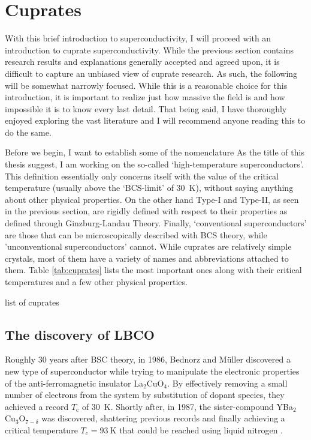\section{Cuprates}
With this brief introduction to superconductivity, I will proceed with an introduction to cuprate superconductivity. While the previous section contains research results and explanations generally accepted and agreed upon, it is difficult to capture an unbiased view of cuprate research. As such, the following will be somewhat narrowly focused. While this is a reasonable choice for this introduction, it is important to realize just how massive the field is and how impossible it is to know every last detail. That being said, I have thoroughly enjoyed exploring the vast literature and I will recommend anyone reading this to do the same.

Before we begin, I want to establish some of the nomenclature  As the title of this thesis suggest, I am working on the so-called `high-temperature superconductors'. This definition essentially only concerns itself with the value of the critical temperature (usually above the `BCS-limit' of \SI{30}{\kelvin}), without saying anything about other physical properties. On the other hand Type-I and Type-II, as seen in the previous section, are rigidly defined with respect to their properties as defined through Ginzburg-Landau Theory. Finally, `conventional superconductors' are those that can be microscopically described with BCS theory, while 'unconventional superconductors' cannot. While cuprates are relatively simple crystals, most of them have a variety of names and abbreviations attached to them. Table \ref{tab:cuprates} lists the most important ones along with their critical temperatures and a few other physical properties.

\begin{table}
    \caption[table of cuprates]{list of cuprates}
    \label{tab:cuprates}
\end{table}

\subsection{The discovery of LBCO}
Roughly 30 years after BSC theory, in 1986, Bednorz and M\"uller discovered a new type of superconductor while trying to manipulate the electronic properties of the anti-ferromagnetic insulator La$_2$CuO$_4$. By effectively removing a small number of electrons from the system by substitution of dopant species, they achieved a record $T_\text{c}$ of \SI{30}{\kelvin}. Shortly after, in 1987, the sister-compound YBa$_2$Cu$_3$O$_{7-\delta}$ was discovered, shattering previous records and finally achieving a critical temperature $T_\text{c} = \SI{93}{\kelvin}$ that could be reached using liquid nitrogen \cite{Wu1987}.

